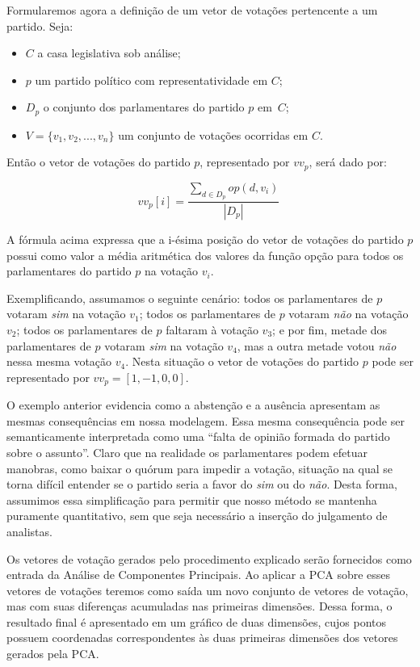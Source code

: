 \documentclass[a4paper, 12pt]{article}
\newcommand\pca{Análise de Componentes Principais}
\begin{document}
Formularemos agora a definição de um vetor de votações pertencente a um partido. Seja:

\begin{itemize}
 \item $C$ a casa legislativa sob análise;
 \item $p$ um partido político com representatividade em $C$;
 \item $D_p$ o conjunto dos parlamentares do partido $p$ em~$C$;
 \item $V = \{v_1, v_2, ..., v_n\}$ um conjunto de votações ocorridas em $C$.
\end{itemize}

Então o vetor de votações do partido $p$, representado por $vv_p$, será dado por:

\[
 vv_p[i] = \frac{ \sum_{d \in D_p}{op(d,v_i)} }{ |D_p| } \
\]

A fórmula acima expressa que a i-ésima posição do vetor de votações do partido $p$ possui como valor a média aritmética dos valores da função opção para todos os parlamentares do partido $p$ na votação $v_i$.

Exemplificando, assumamos o seguinte cenário: todos os parlamentares de $p$ votaram \emph{sim} na votação $v_1$; todos os parlamentares de $p$ votaram \emph{não} na votação $v_2$; todos os parlamentares de $p$ faltaram à votação $v_3$; e por fim, metade dos parlamentares de $p$ votaram \emph{sim} na votação $v_4$, mas a outra metade votou \emph{não} nessa mesma votação $v_4$. Nesta situação o vetor de votações do partido $p$ pode ser representado por $vv_p = [ 1, -1, 0, 0 ]$. 

O exemplo anterior evidencia como a abstenção e a ausência apresentam as mesmas consequências em nossa modelagem. Essa mesma consequência pode ser semanticamente interpretada como uma ``falta de opinião formada do partido sobre o assunto''. Claro que na realidade os parlamentares podem efetuar manobras, como baixar o quórum para impedir a votação, situação na qual se torna difícil entender se o partido seria a favor do \emph{sim} ou do \emph{não}. Desta forma, assumimos essa simplificação para permitir que nosso método se mantenha puramente quantitativo, sem que seja necessário a inserção do julgamento de analistas.

Os vetores de votação gerados pelo procedimento explicado serão fornecidos como entrada da \pca.
Ao aplicar a PCA sobre esses vetores de votações teremos como saída um novo conjunto de vetores de votação, mas com suas diferenças acumuladas nas primeiras dimensões. Dessa forma, o resultado final é apresentado em um gráfico de duas dimensões, cujos pontos possuem coordenadas correspondentes às duas primeiras dimensões dos vetores gerados pela PCA.
\end{document}
